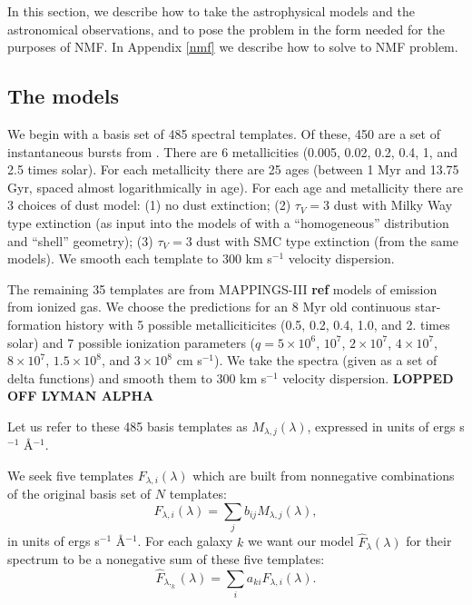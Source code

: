 \documentclass[10pt,preprint]{aastex}
\begin{document}
In this section, we describe how to take the astrophysical
models and the astronomical observations, and to pose the problem in
the form needed for the purposes of NMF. In Appendix \ref{nmf} we describe
how to solve to NMF problem.

\subsection{The models}
\label{models}

We begin with a basis set of 485 spectral templates. Of these, 450 are
a set of instantaneous bursts from \citet{bruzual03a}. There are 6
metallicities (0.005, 0.02, 0.2, 0.4, 1, and 2.5 times solar). For
each metallicity there are 25 ages (between 1 Myr and 13.75 Gyr,
spaced almost logarithmically in age).  For each age and metallicity
there are 3 choices of dust model: (1) no dust extinction; (2) $\tau_V
= 3$ dust with Milky Way type extinction (as input into the models of
\citealt{witt00a} with a ``homogeneous'' distribution and ``shell''
geometry); (3) $\tau_V = 3$ dust with SMC type extinction (from the
same models). We smooth each template to $300$ km s$^{-1}$ velocity
dispersion. 

The remaining 35 templates are from MAPPINGS-III {\bf ref} models of
emission from ionized gas. We choose the predictions for an 8 Myr old
continuous star-formation history with 5 possible metalliciticites
(0.5, 0.2, 0.4, 1.0, and 2. times solar) and 7 possible ionization
parameters ($q= 5\times 10^6$, $10^7$, $2\times 10^7$, $4\times 10^7$,
$8 \times 10^7$, $1.5\times 10^8$, and $3\times 10^8$ cm s$^{-1}$). We
take the spectra (given as a set of delta functions) and smooth them
to $300$ km s$^{-1}$ velocity dispersion. {\bf LOPPED OFF LYMAN ALPHA}

Let us refer to these 485 basis templates as $M_{\lambda,
j}(\lambda)$, expressed in units of ergs s$^{-1}$ \AA$^{-1}$.

We seek five templates $F_{\lambda, i}(\lambda)$ which are built from
nonnegative combinations of the original basis set of $N$ templates:
\begin{equation}
F_{\lambda, i}(\lambda) = \sum_j b_{ij} M_{\lambda, j}(\lambda),
\end{equation}
in units of ergs s$^{-1}$ \AA$^{-1}$.  For each galaxy $k$
we want our model ${\hat{F}_\lambda}(\lambda)$ for their spectrum to
be a nonegative sum of these five templates:
\begin{equation}
{\hat{F}}_{\lambda,_k}(\lambda) = \sum_i a_{ki} F_{\lambda,i}(\lambda).
\end{equation}
\end{document}
